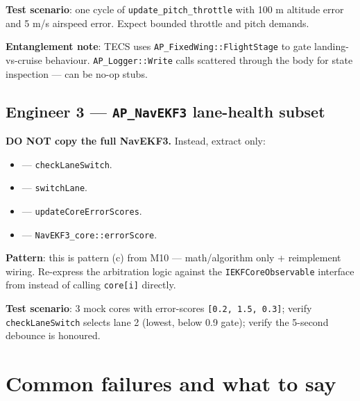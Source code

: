 \documentclass[a4paper,11pt,twoside]{article}
\begin{document}
\textbf{Test scenario}: one cycle of \texttt{update\_pitch\_throttle} with 100 m altitude error and 5 m/s airspeed error. Expect bounded throttle and pitch demands.

\textbf{Entanglement note}: TECS uses \texttt{AP\_FixedWing::FlightStage} to gate landing-vs-cruise behaviour. \texttt{AP\_Logger::Write} calls scattered through the body for state inspection --- can be no-op stubs.

\subsection*{Engineer 3 --- \texttt{AP\_NavEKF3} lane-health subset}

\textbf{DO NOT copy the full NavEKF3.} Instead, extract only:
\begin{itemize}
  \item {} --- \texttt{checkLaneSwitch}.
  \item {} --- \texttt{switchLane}.
  \item {} --- \texttt{updateCoreErrorScores}.
  \item {} --- \texttt{NavEKF3\_core::errorScore}.
\end{itemize}

\textbf{Pattern}: this is pattern (c) from M10 --- math/algorithm only + reimplement wiring. Re-express the arbitration logic against the \texttt{IEKFCoreObservable} interface from  instead of calling \texttt{core[i]} directly.

\textbf{Test scenario}: 3 mock cores with error-scores \texttt{[0.2, 1.5, 0.3]}; verify \texttt{checkLaneSwitch} selects lane 2 (lowest, below 0.9 gate); verify the 5-second debounce is honoured.

\section*{Common failures and what to say}
\end{document}
